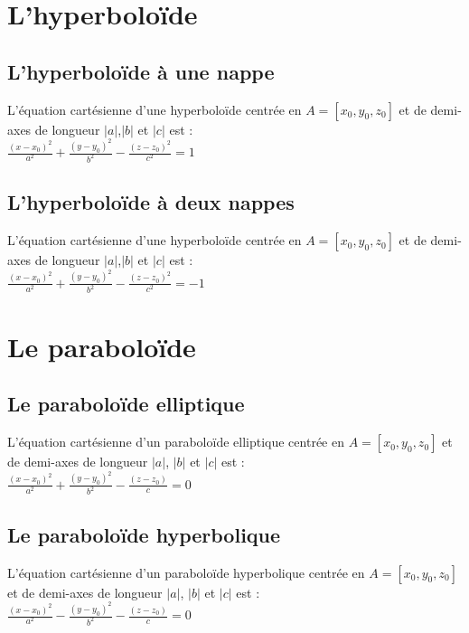 \documentclass[a4paper,11pt]{book}
\begin{document}
\section{L'hyperbolo\"{i}de}
\subsection{L'hyperbolo\"{i}de \`a une nappe}
\noindent L'\'equation cart\'esienne d'une hyperbolo\"{i}de centr\'ee en 
$A=[x_0,y_0,z_0]$
 et de demi-axes de longueur  $|a|$,$|b|$ et $|c|$ est :\\
 $\frac{(x-x_0)^2}{a^2}+\frac{(y-y_0)^2}{b^2}-\frac{(z-z_0)^2}{c^2}=1$ 
\subsection{L'hyperbolo\"{i}de \`a deux nappes}
\noindent L'\'equation cart\'esienne d'une hyperbolo\"{i}de centr\'ee en 
$A=[x_0,y_0,z_0]$
 et de demi-axes de longueur  $|a|$,$|b|$ et $|c|$ est :\\
 $\frac{(x-x_0)^2}{a^2}+\frac{(y-y_0)^2}{b^2}-\frac{(z-z_0)^2}{c^2}=-1$ 

\section{Le parabolo\"{i}de}
\subsection{Le parabolo\"{i}de elliptique}
\noindent L'\'equation cart\'esienne d'un parabolo\"{i}de  elliptique
centr\'ee en 
$A=[x_0,y_0,z_0]$ 
et de demi-axes de longueur  $|a|$, $|b|$ et $|c|$ est :\\
$\displaystyle \frac{(x-x_0)^2}{a^2}+\frac{(y-y_0)^2}{b^2}-\frac{(z-z_0)}{c}=0$ 


\subsection{Le parabolo\"{i}de hyperbolique}
\noindent L'\'equation cart\'esienne d'un parabolo\"{i}de  hyperbolique
centr\'ee en 
$A=[x_0,y_0,z_0]$ 
et de demi-axes de longueur  $|a|$, $|b|$ et $|c|$ est :\\
$\displaystyle
\frac{(x-x_0)^2}{a^2}-\frac{(y-y_0)^2}{b^2}-\frac{(z-z_0)}{c}=0$ 
\end{document}
